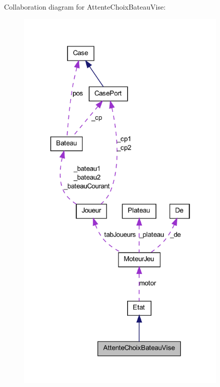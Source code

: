 Collaboration diagram for AttenteChoixBateauVise:
\nopagebreak
\begin{figure}[H]
\begin{center}
\leavevmode
\includegraphics[width=285pt]{class_attente_choix_bateau_vise__coll__graph}
\end{center}
\end{figure}
